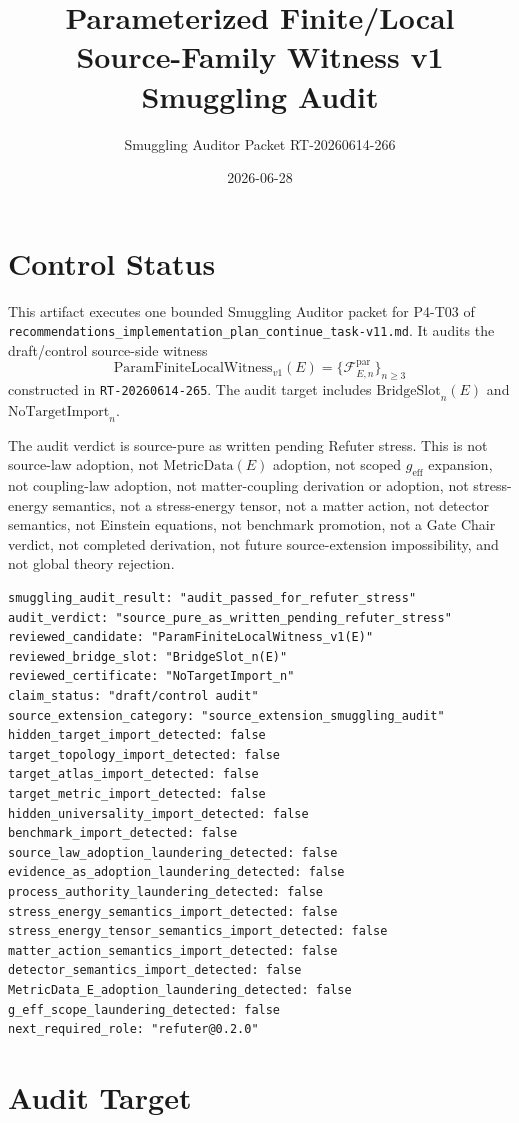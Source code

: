 \documentclass[11pt]{article}
\title{Parameterized Finite/Local Source-Family Witness v1 Smuggling Audit}
\author{Smuggling Auditor Packet RT-20260614-266}
\date{2026-06-28}
\newcommand{\MetricData}{\mathrm{MetricData}}
\newcommand{\geff}{g_{\mathrm{eff}}}
\newcommand{\PFLFW}{\mathrm{ParamFiniteLocalWitness}_{v1}}
\newcommand{\BridgeSlot}{\mathrm{BridgeSlot}}
\newcommand{\NoTargetImport}{\mathrm{NoTargetImport}}
\begin{document}
\maketitle

\section{Control Status}

This artifact executes one bounded Smuggling Auditor packet for P4-T03 of
\texttt{recommendations\_implementation\_plan\_continue\_task-v11.md}. It
audits the draft/control source-side witness
\[
  \PFLFW(E)=\{\mathcal{F}^{\mathrm{par}}_{E,n}\}_{n\ge 3}
\]
constructed in \texttt{RT-20260614-265}. The audit target includes
\(\BridgeSlot_n(E)\) and \(\NoTargetImport_n\).

The audit verdict is source-pure as written pending Refuter stress. This is
not source-law adoption, not \(\MetricData(E)\) adoption, not scoped \(\geff\)
expansion, not coupling-law adoption, not matter-coupling derivation or
adoption, not stress-energy semantics, not a stress-energy tensor, not a
matter action, not detector semantics, not Einstein equations, not benchmark
promotion, not a Gate Chair verdict, not completed derivation, not future
source-extension impossibility, and not global theory rejection.

\begin{verbatim}
smuggling_audit_result: "audit_passed_for_refuter_stress"
audit_verdict: "source_pure_as_written_pending_refuter_stress"
reviewed_candidate: "ParamFiniteLocalWitness_v1(E)"
reviewed_bridge_slot: "BridgeSlot_n(E)"
reviewed_certificate: "NoTargetImport_n"
claim_status: "draft/control audit"
source_extension_category: "source_extension_smuggling_audit"
hidden_target_import_detected: false
target_topology_import_detected: false
target_atlas_import_detected: false
target_metric_import_detected: false
hidden_universality_import_detected: false
benchmark_import_detected: false
source_law_adoption_laundering_detected: false
evidence_as_adoption_laundering_detected: false
process_authority_laundering_detected: false
stress_energy_semantics_import_detected: false
stress_energy_tensor_semantics_import_detected: false
matter_action_semantics_import_detected: false
detector_semantics_import_detected: false
MetricData_E_adoption_laundering_detected: false
g_eff_scope_laundering_detected: false
next_required_role: "refuter@0.2.0"
\end{verbatim}

\section{Audit Target}
\end{document}
